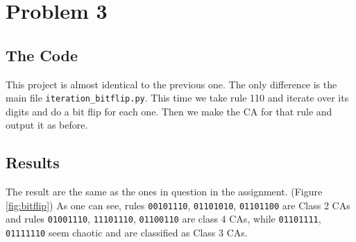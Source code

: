 \documentclass[12pt]{article}
\begin{document}
	\section{Problem 3}
	\subsection{The Code}
	This project is almost identical to the previous one. The only difference is the main file
	\texttt{iteration\_bitflip.py}. This time we take rule 110 and iterate over its digits and do a
	bit flip for each one. Then we make the CA for that rule and output it as before.
	\subsection{Results}
	The result are the same as the ones in question in the assignment.
	(Figure \ref{fig:bitflip}) As one can see, rules \texttt{00101110}, \texttt{01101010}, \texttt{01101100} are Class 2 CAs and  rules \texttt{01001110}, \texttt{11101110}, \texttt{01100110} 
	are class 4 CAs, while \texttt{01101111}, \texttt{01111110} seem chaotic and are classified as Class 3 CAs.
	
\end{document}
